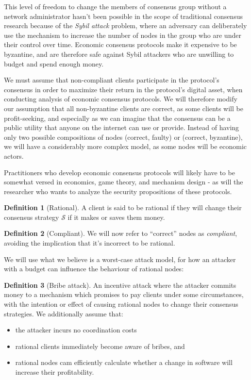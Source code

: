 \documentclass[11pt,a4paper]{article}
\theoremstyle{plain}
\theoremstyle{definition}
\newtheorem{defn}{Definition}
\begin{document}
This level of freedom to change the members of consensus group without a network administrator hasn't been possible in the scope of traditional consensus research because of the \emph{Sybil attack} problem, where an adversary can deliberately use the mechanism to increase the number of nodes in the group who are under their control over time. Economic consensus protocols make it expensive to be byzantine, and are therefore safe against Sybil attackers who are unwilling to budget and spend enough money. 

We must assume that non-compliant clients participate in the protocol's consensus in order to maximize their return in the protocol's digital asset, when conducting analysis of economic consensus protocols. We will therefore modify our assumption that all non-byzantine clients are correct, as some clients will be profit-seeking, and especially as we can imagine that the consensus can be a public utility that anyone on the internet can use or provide. Instead of having only two possible compositions of nodes (correct, faulty) or (correct, byzantine), we will have a considerably more complex model, as some nodes will be economic actors. 

Practitioners who develop economic consensus protocols will likely have to be somewhat versed in economics, game theory, and mechanism design - as will the researcher who wants to analyze the security propositions of these protocols.

\begin{defn}[Rational]
A client is said to be rational if they will change their consensus strategy $\mathcal{S}$ if it makes or saves them money.
\end{defn}

\begin{defn}[Compliant]
We will now refer to ``correct'' nodes as \emph{compliant}, avoiding the implication that it's incorrect to be rational.
\end{defn}

We will use what we believe is a worst-case attack model, for how an attacker with a budget can influence the behaviour of rational nodes:

\begin{defn}[Bribe attack]
An incentive attack where the attacker commits money to a mechanism which promises to pay clients under some circumstances, with the intention or effect of causing rational nodes to change their consensus strategies. We additionally assume that: 
\begin{itemize}
\item the attacker incurs no coordination costs
\item rational clients immediately become aware of bribes, and
\item rational nodes cam efficiently calculate whether a change in software will increase their profitability.
\end{itemize}
\end{defn}
\end{document}
